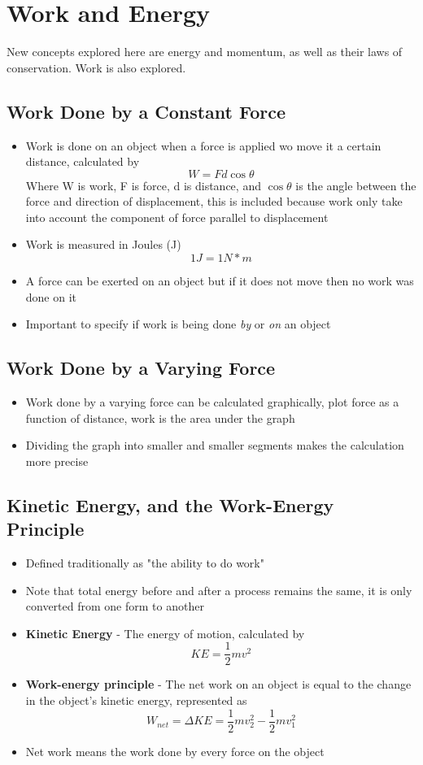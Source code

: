 \section{Work and Energy}
New concepts explored here are energy and momentum, as well as their laws of conservation. Work is also explored.

\subsection{Work Done by a Constant Force}
\begin{itemize}
    \item Work is done on an object when a force is applied wo move it a certain distance, calculated by \[W=Fd\cos\theta\]
    Where W is work, F is force, d is distance, and \(\cos\theta\) is the angle between the force and direction of displacement, this is included because work only take into account the component of force parallel to displacement
    \item Work is measured in Joules (J) \[1J=1N*m\]
    \item A force can be exerted on an object but if it does not move then no work was done on it
    \item Important to specify if work is being done \emph{by} or \emph{on} an object
\end{itemize}

\subsection{Work Done by a Varying Force}
\begin{itemize}
    \item Work done by a varying force can be calculated graphically, plot force as a function of distance, work is the area under the graph
    \item Dividing the graph into smaller and smaller segments makes the calculation more precise
\end{itemize}

\subsection{Kinetic Energy, and the Work-Energy Principle}
\begin{itemize}
    \item Defined traditionally as "the ability to do work"
    \item Note that total energy before and after a process remains the same, it is only converted from one form to another
    \item \textbf{Kinetic Energy} - The energy of motion, calculated by \[KE=\frac{1}{2}mv^2\]
    \item \textbf{Work-energy principle} - The net work on an object is equal to the change in the object's kinetic energy, represented as \[W_{net}=\Delta KE=\frac{1}{2}mv_2^2-\frac{1}{2}mv_1^2\]
    \item Net work means the work done by every force on the object
\end{itemize}

